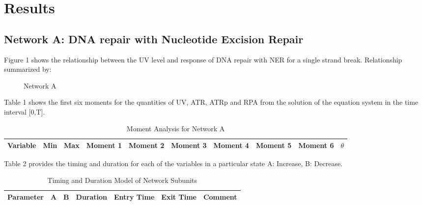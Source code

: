 \documentclass[preprint, 8pt]{elsarticle}
\theoremstyle{definition}
\begin{document}
\section{Results}



\subsection{Network A: DNA repair with Nucleotide Excision Repair}
\raggedright
Figure 1 shows the relationship between the UV level and response of DNA repair with NER for a single strand break.  Relationship summarized by:

\begin{enumerate}
\end{enumerate}

\vspace{6pt}
\begin{figure}[H]
	\centering
	\caption{Network A}
	\label{fig:Figure1}
\end{figure}

Table 1 shows the first six moments for the quantities of UV, ATR, ATRp and RPA from the solution of the equation system in the time interval [0,T].
\centering
\begin{table}[H]\tiny
 \caption{Moment Analysis for Network A}
\begin{tabular}{rp{.3cm}p{.3cm}p{.25cm}p{.25cm}p{.25cm}p{.25cm}p{.25cm}p{.25cm}p{.25cm}}
	\hline
	Variable &Min & Max & Moment 1 & Moment 2 & Moment 3 & Moment 4 & Moment 5 & Moment 6 &  $\theta$\\ 
	\hline
	\hline
	\end{tabular}
\end{table}
\raggedright

Table 2 provides the timing and duration for each of the variables in a particular state A: Increase, B: Decrease.  

\begin{enumerate}
\end{enumerate}

\begin{table}[H]\tiny
  \caption{Timing and Duration Model of Network Subunits}
\begin{tabular}{rllp{1.25cm}lll}
		\hline	
		Parameter & A & B & Duration & Entry Time &  Exit Time & Comment \\
		 \hline 
		\hline
\end{tabular}
\end{table}
\end{document}
